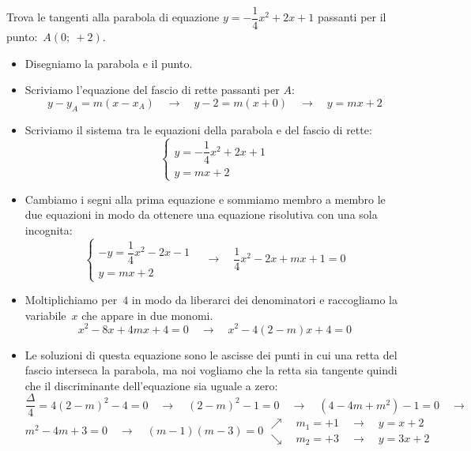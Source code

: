 \begin{esempio}
 Trova le tangenti alla parabola di equazione \(y=-\dfrac{1}{4}x^2+2x +1\)
 passanti per il punto:~\(A(0;~+2)\).

 \begin{itemize}
  \item Disegniamo la parabola e il punto.
  \item Scriviamo l'equazione del fascio di rette passanti per \(A\):
\[y-y_A = m(x-x_A) \quad \rightarrow \quad
y-2 = m\left(x+0\right)
\quad \rightarrow \quad y=mx+2\]
  \item Scriviamo il sistema tra le equazioni della parabola e del fascio di
   rette:
\[\left\{\begin{array}{l}
  y=-\dfrac{1}{4}x^2+2x +1\\
  y=mx+2
\end{array}\right. \]
  \item Cambiamo i segni alla prima equazione e sommiamo membro a membro le
   due equazioni in modo da ottenere una equazione risolutiva con una sola
   incognita:
\[\left\{\begin{array}{l}
  -y=\dfrac{1}{4}x^2-2x-1\\
  y=mx+2
\end{array}\right. \quad \rightarrow \quad
\dfrac{1}{4}x^2-2x+mx+1=0\]
  \item Moltiplichiamo per~\(4\) in modo da liberarci dei denominatori e
   raccogliamo la variabile~\(x\) che appare in due monomi.
\[x^2-8x+4mx+4=0 \quad \rightarrow \quad x^2-4(2-m)x+4=0\]
  \item Le soluzioni di questa equazione sono le ascisse dei punti in cui una
   retta del fascio interseca la parabola, ma noi vogliamo che la retta sia
   tangente quindi che il discriminante dell'equazione sia uguale a zero:
\[\dfrac{\Delta}{4}=4(2-m)^2-4=0 \quad \rightarrow \quad
(2-m)^2-1=0 \quad \rightarrow \quad
(4-4m+m^2)-1=0 \quad \rightarrow \quad\]
\[m^2-4m+3=0 \quad \rightarrow \quad
(m-1)(m-3)=0
 \begin{array}{l}
  \nearrow \quad m_1=+1 \quad \rightarrow \quad y=x+2\\
  \searrow \quad m_2=+3 \quad \rightarrow \quad y=3x+2
 \end{array}\]
 \end{itemize}
\end{esempio}

